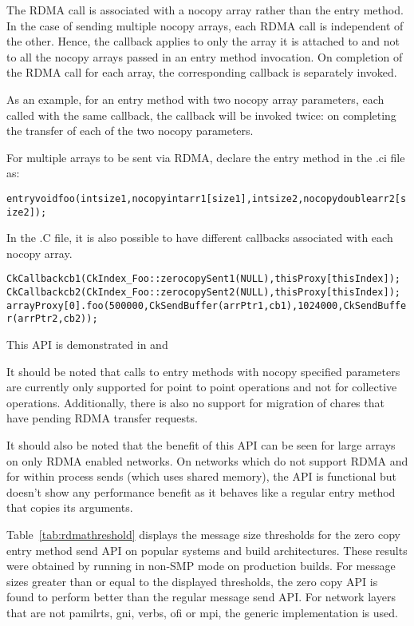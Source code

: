 The RDMA call is associated with a nocopy array rather than the entry method.
In the case of sending multiple nocopy arrays, each RDMA call is independent of the other.
Hence, the callback applies to only the array it is attached to and not to all the nocopy
arrays passed in an entry method invocation. On completion of the RDMA call for each
array, the corresponding callback is separately invoked.

As an example, for an entry method with two nocopy array parameters, each called with the same
callback, the callback will be invoked twice: on completing the transfer of each of the two
nocopy parameters.

\vspace{0.1in}
\noindent
For multiple arrays to be sent via RDMA, declare the entry method in the .ci file as:

\begin{alltt}
entry void foo (int size1, nocopy int arr1[size1], int size2, nocopy double arr2[size2]);
\end{alltt}

In the .C file, it is also possible to have different callbacks associated with each nocopy array.
\begin{alltt}
CkCallback cb1(CkIndex_Foo::zerocopySent1(NULL), thisProxy[thisIndex]);
CkCallback cb2(CkIndex_Foo::zerocopySent2(NULL), thisProxy[thisIndex]);
arrayProxy[0].foo(500000, CkSendBuffer(arrPtr1, cb1), 1024000, CkSendBuffer(arrPtr2, cb2));
\end{alltt}

This API is demonstrated in 
and 

\vspace{0.1in}
\noindent
It should be noted that calls to entry methods with nocopy specified parameters are
currently only supported for point to point operations and not for collective operations.
Additionally, there is also no support for migration of chares that have pending RDMA transfer
requests.

\vspace{0.1in}
\noindent
It should also be noted that the benefit of this API can be seen for large arrays on
only RDMA enabled networks. On networks which do not support RDMA and for within process sends
(which uses shared memory), the API is functional but doesn't show any performance benefit as it
behaves like a regular entry method that copies its arguments.

Table~\ref{tab:rdmathreshold} displays the message size thresholds for the zero copy entry method
send API on popular systems and build architectures. These results were obtained by running
 in non-SMP mode
on production builds. For message sizes greater than or equal to the displayed thresholds,
the zero copy API is found to perform better than the regular message send API. For network layers
that are not pamilrts, gni, verbs, ofi or mpi, the generic implementation is used.

